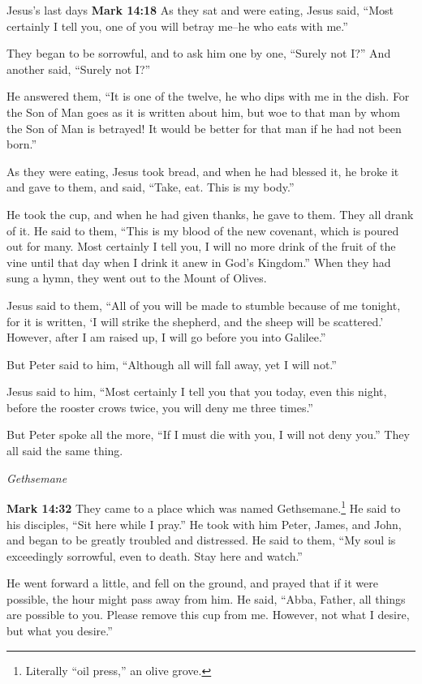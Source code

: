 \documentclass[10pt,twoside]{article} %
\newcommand{\quotesize}{\normalsize{}}
\newenvironment{quotetext}{\begingroup\quotesize}{\endgroup}
\newcommand{\bible}[2]{\begin{quotetext}\textbf{#1} #2\end{quotetext}}
\newcommand{\gospelmark}[2]{\bible{Mark #1}{#2}}
\newcommand{\subhead}[1]{\emph{#1}\par}
\begin{document}
\begin{section}{Jesus's last days}
\gospelmark{14:18}{
     As they sat and were eating, Jesus said, ``Most certainly I tell you, one of you will betray me--he who eats with me.''

  They began to be sorrowful, and to ask him one by one, ``Surely not I?'' And another said, ``Surely not I?''

  He answered them, ``It is one of the twelve, he who dips with me in the dish.    For the Son of Man goes as it is written about him, but woe to that man by whom the Son of Man is betrayed! It would be better for that man if he had not been born.''

  As they were eating, Jesus took bread, and when he had blessed it, he broke it and gave to them, and said, ``Take, eat. This is my body.''

  He took the cup, and when he had given thanks, he gave to them. They all drank of it.   He said to them, ``This is my blood of the new covenant, which is poured out for many.    Most certainly I tell you, I will no more drink of the fruit of the vine until that day when I drink it anew in God's Kingdom.''   When they had sung a hymn, they went out to the Mount of Olives.

  Jesus said to them, ``All of you will be made to stumble because of me tonight, for it is written, `I will strike the shepherd, and the sheep will be scattered.'    However, after I am raised up, I will go before you into Galilee.''

  But Peter said to him, ``Although all will fall away, yet I will not.''

  Jesus said to him, ``Most certainly I tell you that you today, even this night, before the rooster crows twice, you will deny me three times.''

  But Peter spoke all the more, ``If I must die with you, I will not deny you.'' They all said the same thing.
}

\subhead{Gethsemane}

\gospelmark{14:32}{
  They came to a place which was named Gethsemane.\footnote{Literally ``oil press,'' an olive grove.}
He said to his disciples, ``Sit here while I pray.''   He took with him Peter, James, and John, and began to be greatly troubled and distressed.   He said to them, ``My soul is exceedingly sorrowful, even to death. Stay here and watch.''

  He went forward a little, and fell on the ground, and prayed that if it were possible, the hour might pass away from him.   He said, ``Abba, Father, all things are possible to you. Please remove this cup from me. However, not what I desire, but what you desire.''

}
\end{section}
\end{document}
